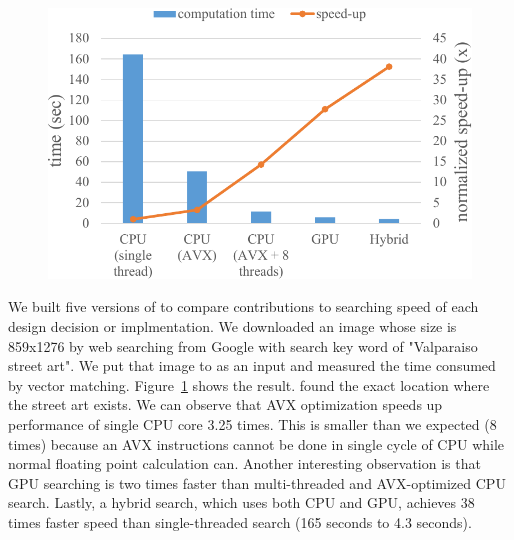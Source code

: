 \begin{figure}[t]
	\centering
	\includegraphics[scale=0.64]{figs/speed_up}
	\vspace{-0.1in}
	\vspace{-0.1in}
	\label{fig:speed_up}
\end{figure}

We built five versions of \name{} to compare contributions to searching speed of each design decision or implmentation.
We downloaded an image whose size is 859x1276 by web searching from Google with search key word of "Valparaiso street art".
We put that image to \name{} as an input and measured the time consumed by vector matching.
Figure~\ref{fig:speed_up} shows the result.
\name{} found the exact location where the street art exists.
We can observe that AVX optimization speeds up performance of single CPU core 3.25 times.
This is smaller than we expected (8 times) because an AVX instructions cannot be done in single cycle of CPU while normal floating point calculation can.
Another interesting observation is that GPU searching is two times faster than multi-threaded and AVX-optimized CPU search.
Lastly, a hybrid search, which uses both CPU and GPU, achieves 38 times faster speed than single-threaded search (165 seconds to 4.3 seconds).

